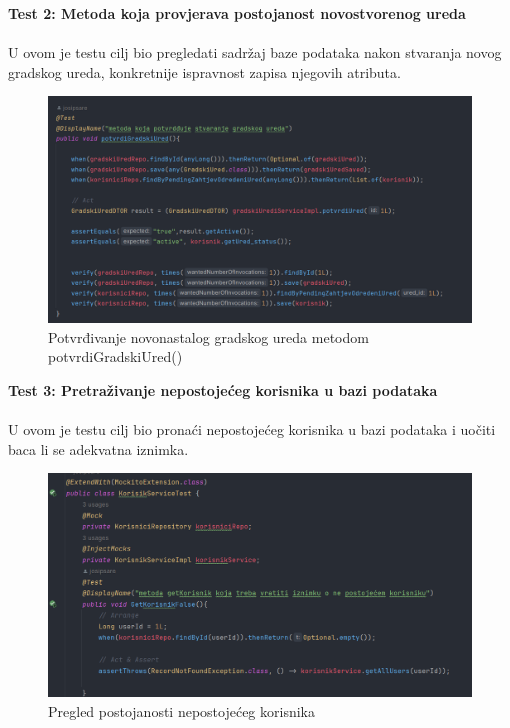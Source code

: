 			
			 \textbf{Test 2: Metoda koja provjerava postojanost novostvorenog ureda}\\
			\\ U ovom je testu cilj bio pregledati sadržaj baze podataka nakon stvaranja novog gradskog ureda, konkretnije ispravnost zapisa njegovih atributa.
			
			\begin{figure}[H]
			\includegraphics[scale=0.4]{slike/potvrdiUred.PNG} %
			\centering
			\caption{Potvrđivanje novonastalog gradskog ureda metodom potvrdiGradskiUred()}
			\label{fig:implementacija}
		\end{figure}
		
		
		\textbf{Test 3: Pretraživanje nepostojećeg korisnika u bazi podataka}\\
			\\ U ovom je testu cilj bio pronaći nepostojećeg korisnika u bazi podataka i uočiti baca li se adekvatna iznimka.
			
			\begin{figure}[H]
			\includegraphics[scale=0.6]{slike/nepostojeciUser.PNG} %
			\centering
			\caption{Pregled postojanosti nepostojećeg korisnika}
			\label{fig:implementacija}
		\end{figure}
		
